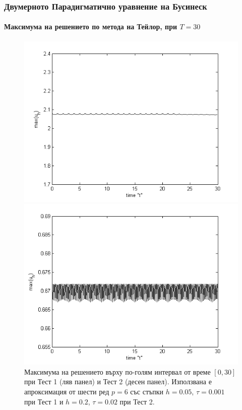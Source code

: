 \documentclass{beamer}
\begin{document}
\begin{frame}
\frametitle{Двумерното Парадигматично уравнение на Бусинеск}
\framesubtitle{Максимума на решението по метода на Тейлор, при $T=30$}

\begin{figure}[ht]
	\centering
	\begin{minipage}[b]{0.45\linewidth}
		\includegraphics[width=\linewidth]{../amitans/figures/maximum_30_T30_bt3_c045_h005.png}
	\end{minipage}	
	\begin{minipage}[b]{0.45\linewidth}
		 \includegraphics[width=\linewidth]{../amitans/figures/maximum_30_T30_bt1_c090_h020.png}
	\end{minipage}
\caption{Максимума на решението върху по-голям интервал от време $[0, 30]$ при Тест 1 (ляв панел) и Тест 2 (десен панел). Използвана е апроксимация от шести ред $p=6$ със стъпки $h=0.05$, $\tau = 0.001$ при Тест 1 и $h=0.2$,  $\tau=0.02$ при Тест 2.}
\end{figure}

\end{frame}
\end{document}
